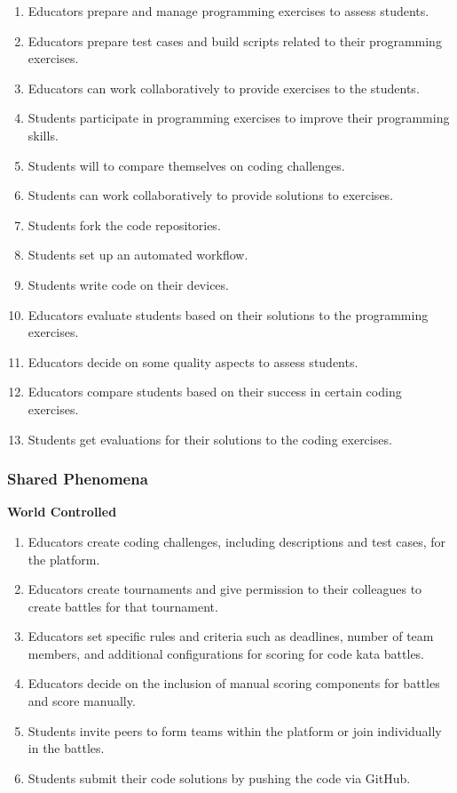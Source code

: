 \begin{enumerate}
    \item Educators prepare and manage programming exercises to assess students.
    \item Educators prepare test cases and build scripts related to their programming exercises.
    \item Educators can work collaboratively to provide exercises to the students.
    \item Students participate in programming exercises to improve their programming skills.
    \item Students will to compare themselves on coding challenges.
    \item Students can work collaboratively to provide solutions to exercises.
    \item Students fork the code repositories.
    \item Students set up an automated workflow.
    \item Students write code on their devices.
    \item Educators evaluate students based on their solutions to the programming exercises.
    \item Educators decide on some quality aspects to assess students.
    \item Educators compare students based on their success in certain coding exercises. 
    \item Students get evaluations for their solutions to the coding exercises. 
\end{enumerate}

\subsubsection{Shared Phenomena}


\quad \space \space \textbf{World Controlled}
\begin{enumerate}
    \item Educators create coding challenges, including descriptions and test cases, for the platform.
    \item Educators create tournaments and give permission to their colleagues to create battles for that tournament.
    \item Educators set specific rules and criteria such as deadlines, number of team members, and additional configurations for scoring for code kata battles.
    \item Educators decide on the inclusion of manual scoring components for battles and score manually.
    \item Students invite peers to form teams within the platform or join individually in the battles.
    \item Students submit their code solutions by pushing the code via GitHub.
    
\end{enumerate}

